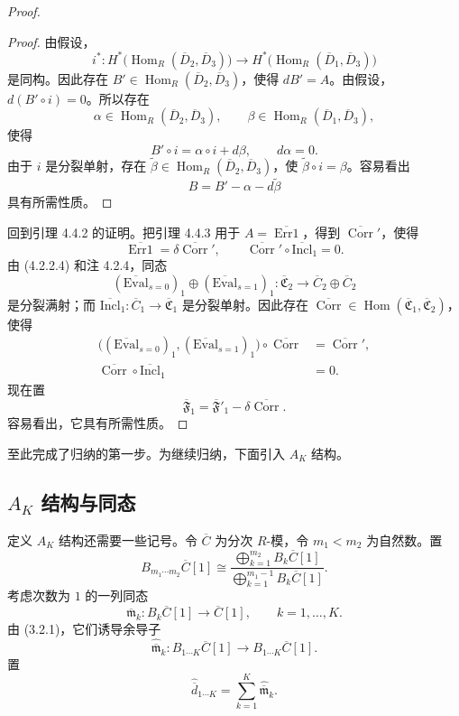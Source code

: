 \begin{proof}
\begin{proof}
由假设，
\[
 i^*\colon
 H^*\bigl(\operatorname{Hom}_R(\overline D_2,\overline D_3)\bigr)
 \longrightarrow
 H^*\bigl(\operatorname{Hom}_R(\overline D_1,\overline D_3)\bigr)
\]
是同构。因此存在
$B'\in\operatorname{Hom}_R(\overline D_2,\overline D_3)$，使得
$dB'=A$。由假设，$d(B'\circ i)=0$。所以存在
\[
 \alpha\in\operatorname{Hom}_R(\overline D_2,\overline D_3),
 \qquad
 \beta\in\operatorname{Hom}_R(\overline D_1,\overline D_3),
\]
使得
\[
 B'\circ i=\alpha\circ i+d\beta,
 \qquad d\alpha=0.
\]
由于 $i$ 是分裂单射，存在
$\widetilde\beta\in
\operatorname{Hom}_R(\overline D_2,\overline D_3)$，使
$\widetilde\beta\circ i=\beta$。容易看出
\[
 B=B'-\alpha-d\widetilde\beta
\]
具有所需性质。
\end{proof}

回到引理 4.4.2 的证明。把引理 4.4.3 用于
$A=\overline{\operatorname{Err1}}$，得到
$\overline{\operatorname{Corr}}'$，使得
\[
 \overline{\operatorname{Err1}}
 =\delta\overline{\operatorname{Corr}}',
 \qquad
 \overline{\operatorname{Corr}}'
 \circ\overline{\mathrm{Incl}}_1=0.
\]
由 (4.2.2.4) 和注 4.2.4，同态
\[
 (\overline{\mathrm{Eval}}_{s=0})_1
 \oplus(\overline{\mathrm{Eval}}_{s=1})_1
 \colon\overline{\mathfrak C}_2
 \longrightarrow\overline C_2\oplus\overline C_2
\]
是分裂满射；而
$\overline{\mathrm{Incl}}_1\colon
\overline C_1\to\overline{\mathfrak C}_1$ 是分裂单射。因此存在
$\overline{\operatorname{Corr}}\in
\operatorname{Hom}(\overline{\mathfrak C}_1,
\overline{\mathfrak C}_2)$，使得
\begin{align}
 \bigl((\overline{\mathrm{Eval}}_{s=0})_1,
 (\overline{\mathrm{Eval}}_{s=1})_1\bigr)
 \circ\overline{\operatorname{Corr}}
 &=\overline{\operatorname{Corr}}',
 \tag{4.4.4.1}\label{eq:4-4-4-1}\\
 \overline{\operatorname{Corr}}
 \circ\overline{\mathrm{Incl}}_1&=0.
 \tag{4.4.4.2}\label{eq:4-4-4-2}
\end{align}
现在置
\[
 \overline{\mathfrak F}_1
 =\overline{\mathfrak F}'_1
 -\delta\overline{\operatorname{Corr}}.
\]
容易看出，它具有所需性质。
\end{proof}

至此完成了归纳的第一步。为继续归纳，下面引入 $A_K$ 结构。

\subsection{$A_K$ 结构与同态}
\label{subsec:4-4-2}

定义 $A_K$ 结构还需要一些记号。令 $\overline C$ 为分次 $R$-模，令
$m_1<m_2$ 为自然数。置
\begin{equation}
 B_{m_1\cdots m_2}\overline C[1]
 \cong
 \frac{\displaystyle\bigoplus_{k=1}^{m_2}B_k\overline C[1]}
 {\displaystyle\bigoplus_{k=1}^{m_1-1}B_k\overline C[1]}.
\tag{4.4.5}\label{eq:4-4-5}
\end{equation}
考虑次数为 $1$ 的一列同态
\[
 \overline{\mathfrak m}_k\colon
 B_k\overline C[1]\longrightarrow\overline C[1],
 \qquad k=1,\ldots,K.
\]
由 (3.2.1)，它们诱导余导子
\[
 \widehat{\overline{\mathfrak m}}_k\colon
 B_{1\cdots K}\overline C[1]
 \longrightarrow B_{1\cdots K}\overline C[1].
\]
置
\[
 \widehat{\overline d}_{1\cdots K}
 =\sum_{k=1}^K\widehat{\overline{\mathfrak m}}_k.
\]

